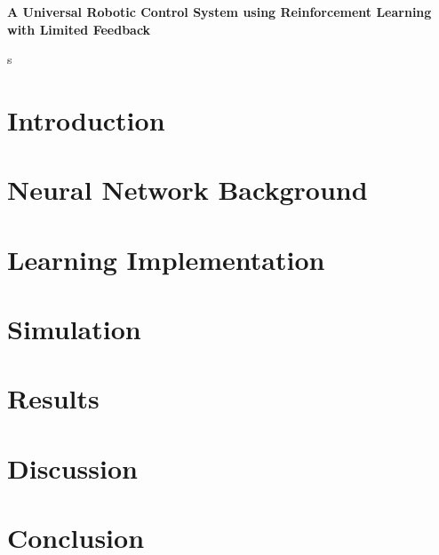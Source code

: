 \documentclass[letterpaper,12pt]{article}
\begin{document}
\begin{titlepage}
	\begin{center}
		{\Large \textbf{A Universal Robotic Control System using Reinforcement Learning with Limited Feedback}}\\
		\vspace{1.5cm}
	\end{center}s
	
\end{titlepage}

\pagebreak

\section{Introduction}



\section{Neural Network Background}



\section{Learning Implementation}



\section{Simulation}



\section{Results}



\section{Discussion}



\section{Conclusion}



\nocite{gaskett,geoffrey,werbos,dini,macleod,dongsoo,dudek,watkins,rummery,baird}

\pagebreak


\end{document}
